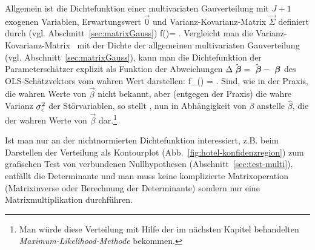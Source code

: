 Allgemein ist die Dichtefunktion einer multivariaten Gau\3verteilung mit $J+1$
exogenen Variablen, Erwartungswert $\vec{0}$ und
Varianz-Kovarianz-Matrix $\vec{\Sigma}$ definiert durch 
(vgl. Abschnitt~\ref{sec:matrixGauss})
\be
\label{defDensityGaussMulti}
f()=
\exp{}.
\ee
Vergleicht man die Varianz-Kovarianz-Matrix~ mit
der Dichte der allgemeinen multivariaten Gau\3verteilung (vgl. 
Abschnitt~\ref{sec:matrixGauss}),
kann man die Dichtefunktion der Parametersch\"atzer 
explizit als Funktion der Abweichungen 
$\Delta \hat{{\mbox{ \boldmath{$\beta$}}}}=\hat{{\mbox{ \boldmath{$\beta$}}}}-{\mbox{ \boldmath{$\beta$}}}$ des
OLS-Sch\"atzvektors vom wahren Wert darstellen:
\be
\label{betaDensity}
f_{\hatvecbeta}(\Delta \hatvecbeta)
 = 
 \exp{}.
\ee
Sind, wie in der Praxis, die wahren Werte von $\vec{\beta}$ nicht
bekannt, aber (entgegen der Praxis) die wahre Varianz $\sigma_{\epsilon}^2$ der
St\"orvariablen, so stellt , nun in Abh\"angigkeit
von $\beta$ anstelle $\hat{\beta}$, die 
der wahren Werte von $\vec{\beta}$ dar.\footnote{Man w\"urde diese
Verteilung mit Hilfe der im n\"achsten Kapitel behandelten 
\emph{Maximum-Likelihood-Methode} bekommen.} 
  
Ist man nur an der nichtnormierten Dichtefunktion interessiert,
z.B. beim Darstellen der Verteilung als Kontourplot
(Abb.~\ref{fig:hotel-konfidenzregion}) zum grafischen Test von verbundenen
Nullhypothesen (Abschnitt~\ref{sec:test-multi}), entf\"allt die
Determinante und man muss keine komplizierte Matrixoperation
(Matrixinverse oder Berechnung der Determinante) sondern nur eine
Matrixmultiplikation durchf\"uhren.



